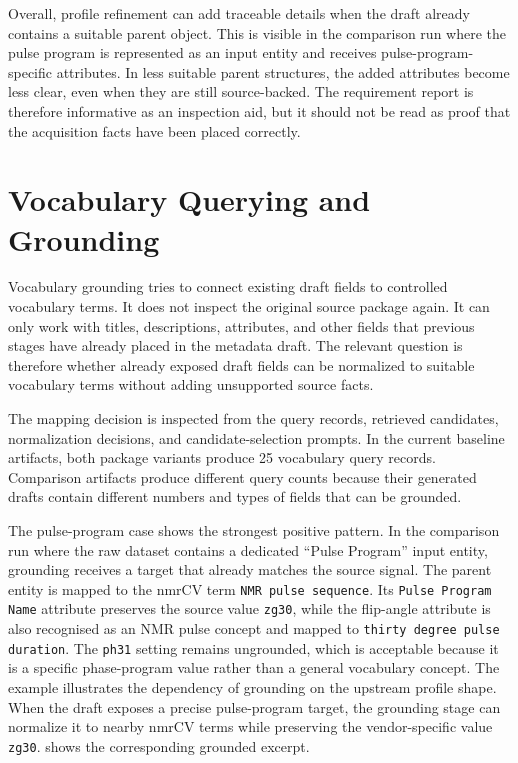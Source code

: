 Overall, profile refinement can add traceable details when the draft already contains a suitable parent object.
This is visible in the comparison run where the pulse program is represented as an input entity and receives pulse-program-specific attributes.
In less suitable parent structures, the added attributes become less clear, even when they are still source-backed.
The requirement report is therefore informative as an inspection aid, but it should not be read as proof that the acquisition facts have been placed correctly.

\section{Vocabulary Querying and Grounding}
\label{sec:evaluation-grounding-observations}

Vocabulary grounding tries to connect existing draft fields to controlled vocabulary terms.
It does not inspect the original source package again.
It can only work with titles, descriptions, attributes, and other fields that previous stages have already placed in the metadata draft.
The relevant question is therefore whether already exposed draft fields can be normalized to suitable vocabulary terms without adding unsupported source facts.

The mapping decision is inspected from the query records, retrieved candidates, normalization decisions, and candidate-selection prompts.
In the current baseline artifacts, both package variants produce 25 vocabulary query records.
Comparison artifacts produce different query counts because their generated drafts contain different numbers and types of fields that can be grounded.

The pulse-program case shows the strongest positive pattern.
In the comparison run where the raw dataset contains a dedicated \enquote{Pulse Program} input entity, grounding receives a target that already matches the source signal.
The parent entity is mapped to the \ac{nmrCV} term \texttt{NMR pulse sequence}.
Its \texttt{Pulse Program Name} attribute preserves the source value \texttt{zg30}, while the flip-angle attribute is also recognised as an NMR pulse concept and mapped to \texttt{thirty degree pulse duration}.
The \texttt{ph31} setting remains ungrounded, which is acceptable because it is a specific phase-program value rather than a general vocabulary concept.
The example illustrates the dependency of grounding on the upstream profile shape.
When the draft exposes a precise pulse-program target, the grounding stage can normalize it to nearby \ac{nmrCV} terms while preserving the vendor-specific value \texttt{zg30}.
 shows the corresponding grounded excerpt.

